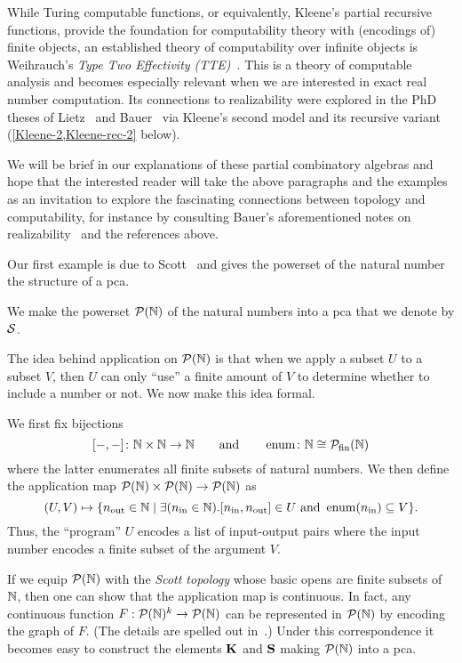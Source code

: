 While Turing computable functions, or equivalently, Kleene's partial recursive
functions, provide the foundation for computability theory with (encodings of)
finite objects, an established theory of computability over infinite objects is
Weihrauch's \emph{Type Two Effectivity (TTE)}~\cite{Weihrauch2000}.
%
This is a theory of computable analysis and becomes especially relevant when we
are interested in exact real number computation.
%
Its connections to realizability were explored in the PhD theses of
Lietz~\cite{Lietz2004} and Bauer~\cite{Bauer2000} via Kleene's second model and
its recursive variant (\cref{Kleene-2,Kleene-rec-2} below).

We will be brief in our explanations of these partial combinatory algebras and hope
that the interested reader will take the above paragraphs and the examples as an
invitation to explore the fascinating connections between topology and
computability, for instance by consulting Bauer's aforementioned notes on
realizability~\cite{Bauer2023} and the references above.

Our first example is due to Scott~\cite{Scott1976} and gives the powerset of the
natural number the structure of a pca.

\begin{example}
  We make the powerset \(\mathcal P(\mathbb N)\) of the natural numbers into a pca that we denote
  by \(\mathcal S\).

  The idea behind application on \(\mathcal P(\mathbb N)\) is that when we apply a subset \(U\) to
  a subset \(V\), then \(U\) can only ``use'' a finite amount of \(V\) to
  determine whether to include a number or not. We now make this idea formal.

  We first fix bijections
  \[
    [{-},{-}] \colon \mathbb N \times \mathbb N \to \mathbb N
    \quad\quad\text{and}\quad\quad
    \operatorname{enum} \colon \mathbb N \cong \mathcal P_{\operatorname{fin}}(\mathbb N)
  \]
  where the latter enumerates all finite subsets of natural numbers.
  We then define the application map \(\mathcal P(\mathbb N) \times \mathcal P(\mathbb N) \to \mathcal P(\mathbb N)\) as
  \[
    (U,V) \mapsto \{n_{\operatorname{out}} \in \mathbb N \mid
            \exists(n_{\operatorname{in}} \in \mathbb N) .
            [n_{\operatorname{in}},n_{\operatorname{out}}] \in U \text{ and } \operatorname{enum}(n_{\operatorname{in}}) \subseteq V\}.
  \]
  Thus, the ``program'' \(U\) encodes a list of input-output pairs where the
  input number encodes a finite subset of the argument \(V\).

  If we equip \(\mathcal P(\mathbb N)\) with the \emph{Scott topology} whose basic opens are
  finite subsets of \(\mathbb N\), then one can show that the application map is
  continuous.
  In fact, any continuous function \(F : \mathcal P(\mathbb N)^k \to \mathcal P(\mathbb N)\) can be represented in
  \(\mathcal P(\mathbb N)\) by encoding the graph of \(F\).
  (The details are spelled out in~\cite[Example~2.3.4]{deJong2018}.)
  Under this correspondence it becomes easy to construct the elements \(\operatorname{\mathbf{K}}\)
  and \(\operatorname{\mathbf{S}}\) making \(\mathcal P(\mathbb N)\) into a pca.
\end{example}

